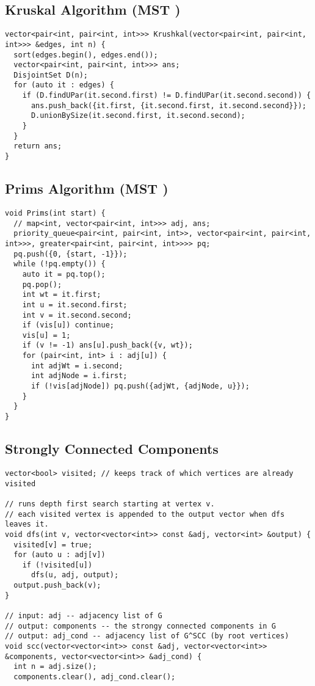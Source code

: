 \documentclass[10pt, a4paper]{article}
\begin{document}
\begin{multicols}{2}
\subsection{Kruskal Algorithm (MST \allowbreak)}
\begin{lstlisting}
vector<pair<int, pair<int, int>>> Krushkal(vector<pair<int, pair<int, int>>> &edges, int n) {
  sort(edges.begin(), edges.end());
  vector<pair<int, pair<int, int>>> ans;
  DisjointSet D(n);
  for (auto it : edges) {
    if (D.findUPar(it.second.first) != D.findUPar(it.second.second)) {
      ans.push_back({it.first, {it.second.first, it.second.second}});
      D.unionBySize(it.second.first, it.second.second);
    }
  }
  return ans;
}
\end{lstlisting}
\subsection{Prims Algorithm (MST \allowbreak)}
\begin{lstlisting}
void Prims(int start) {
  // map<int, vector<pair<int, int>>> adj, ans;
  priority_queue<pair<int, pair<int, int>>, vector<pair<int, pair<int, int>>>, greater<pair<int, pair<int, int>>>> pq;
  pq.push({0, {start, -1}});
  while (!pq.empty()) {
    auto it = pq.top();
    pq.pop();
    int wt = it.first;
    int u = it.second.first;
    int v = it.second.second;
    if (vis[u]) continue;
    vis[u] = 1;
    if (v != -1) ans[u].push_back({v, wt});
    for (pair<int, int> i : adj[u]) {
      int adjWt = i.second;
      int adjNode = i.first;
      if (!vis[adjNode]) pq.push({adjWt, {adjNode, u}});
    }
  }
}
\end{lstlisting}
\subsection{Strongly Connected Components}
\begin{lstlisting}
vector<bool> visited; // keeps track of which vertices are already visited

// runs depth first search starting at vertex v.
// each visited vertex is appended to the output vector when dfs leaves it.
void dfs(int v, vector<vector<int>> const &adj, vector<int> &output) {
  visited[v] = true;
  for (auto u : adj[v])
    if (!visited[u])
      dfs(u, adj, output);
  output.push_back(v);
}

// input: adj -- adjacency list of G
// output: components -- the strongy connected components in G
// output: adj_cond -- adjacency list of G^SCC (by root vertices)
void scc(vector<vector<int>> const &adj, vector<vector<int>> &components, vector<vector<int>> &adj_cond) {
  int n = adj.size();
  components.clear(), adj_cond.clear();


\end{lstlisting}
\end{multicols}
\end{document}
